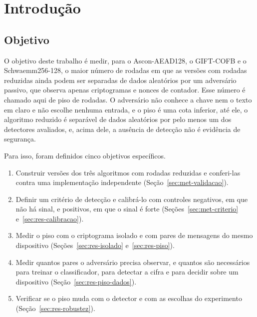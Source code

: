 \chapter{Introdução}
\label{cap:introducao}

\section{Objetivo}
\label{sec:intro-objetivo}

O objetivo deste trabalho é medir, para o Ascon-AEAD128, o GIFT-COFB e o Schwaemm256-128, o maior número de rodadas em que as versões com rodadas reduzidas ainda podem ser separadas de dados aleatórios por um adversário passivo, que observa apenas criptogramas e nonces de contador. Esse número é chamado aqui de piso de rodadas. O adversário não conhece a chave nem o texto em claro e não escolhe nenhuma entrada, e o piso é uma cota inferior, até ele, o algoritmo reduzido é separável de dados aleatórios por pelo menos um dos detectores avaliados, e, acima dele, a ausência de detecção não é evidência de segurança.

Para isso, foram definidos cinco objetivos específicos.
\begin{enumerate}
\item Construir versões dos três algoritmos com rodadas reduzidas e conferi-las contra uma implementação independente (Seção~\ref{sec:met-validacao}).
\item Definir um critério de detecção e calibrá-lo com controles negativos, em que não há sinal, e positivos, em que o sinal é forte (Seções~\ref{sec:met-criterio} e~\ref{sec:res-calibracao}).
\item Medir o piso com o criptograma isolado e com pares de mensagens do mesmo dispositivo (Seções~\ref{sec:res-isolado} e~\ref{sec:res-piso}).
\item Medir quantos pares o adversário precisa observar, e quantos são necessários para treinar o classificador, para detectar a cifra e para decidir sobre um dispositivo (Seção~\ref{sec:res-piso-dados}).
\item Verificar se o piso muda com o detector e com as escolhas do experimento (Seção~\ref{sec:res-robustez}).
\end{enumerate}

